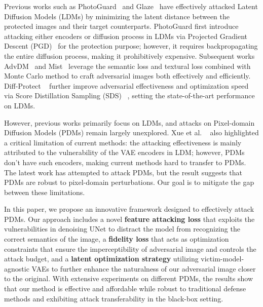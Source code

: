 Previous works such as PhotoGuard~\cite{salman2023raisingcostmaliciousaipowered} and Glaze~\cite{shan2023glazeprotectingartistsstyle} have effectively attacked Latent Diffusion Models (LDMs) by minimizing the latent distance between the protected images and their target counterparts. PhotoGuard first introduce attacking either encoders or diffusion process in LDMs via Projected Gradient Descent (PGD)~\cite{madry2018towards} for the protection purpose; however, it requires backpropagating the entire diffusion process, making it prohibitively expensive. Subsequent works AdvDM~\cite{liang2023adversarialexampledoesgood} and Mist~\cite{liang2023mistimprovedadversarialexamples} leverage the semantic loss and textural loss combined with Monte Carlo method to craft adversarial images both effectively and efficiently. Diff-Protect ~\cite{xue2024diffusion} 
further improve adversarial effectiveness and optimization speed via Score Distillation Sampling (SDS) ~\cite{poole2022dreamfusiontextto3dusing2d}, setting the state-of-the-art performance on LDMs.

However, previous works primarily focus on LDMs, and attacks on Pixel-domain Diffusion Models (PDMs) remain largely unexplored. Xue et al. ~\cite{xue2024diffusion} also highlighted a critical limitation of current methods: the attacking effectiveness is mainly attributed to the vulnerability of the VAE encoders in LDM; however, PDMs don't have such encoders, making current methods hard to transfer to PDMs. The latest work \cite{xue2024pixelbarrierdiffusionmodels} has attempted to attack PDMs, but the result suggests that PDMs are robust to pixel-domain perturbations. Our goal is to mitigate the gap between these limitations.

In this paper, we propose an innovative framework designed to effectively attack PDMs. Our approach includes a novel \textbf{feature attacking loss} that exploits the vulnerabilities in denoising UNet to distract the model from recognizing the correct semantics of the image, a \textbf{fidelity loss} that acts as optimization constraints that ensure the imperceptibility of adversarial image and controls the attack budget, and a \textbf{latent optimization strategy} utilizing victim-model-agnostic VAEs to further enhance the naturalness of our adversarial image closer to the original. With extensive experiments on different PDMs, the results show that our method is effective and affordable while robust to traditional defense methods and exhibiting attack transferability in the black-box setting. 

